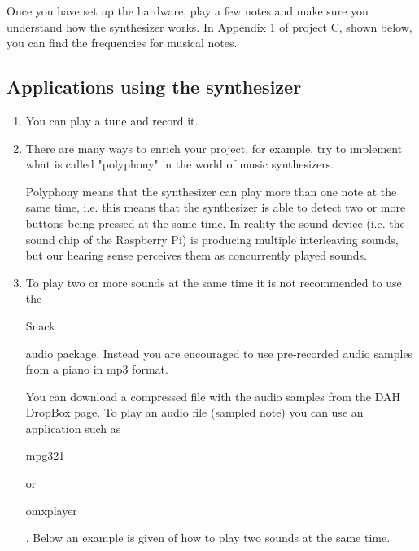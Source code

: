 Once you have set up the hardware, play a few notes and make sure you understand how the synthesizer works. In Appendix 1 of project C, shown below, you can find the frequencies for musical notes.


\subsection{Applications using the synthesizer}

\begin{enumerate}
\item	You can play a tune and record it.


\item There are many ways to enrich your project, for example, try to implement what is called "polyphony" in the world of music synthesizers.

Polyphony means that the synthesizer can play more than one note at the same time, i.e. this means that the synthesizer is able to detect two or more buttons being pressed at the same time. In reality the sound device (i.e. the sound chip of the Raspberry Pi) is producing multiple interleaving sounds, but our hearing sense perceives them as concurrently played sounds.

\item To play two or more sounds at the same time it is not recommended to use the \begin{tt}Snack\end{tt} audio package. Instead you are encouraged to use pre-recorded audio samples from a piano in mp3 format. 

You can download a compressed file with the audio samples from the DAH DropBox page. To play an audio file (sampled note) 
you can use an application such as \begin{tt}mpg321\end{tt} or  \begin{tt}omxplayer\end{tt}. Below an example is given of how to play two sounds at the same time.\\


\vspace*{-0.5cm}
\end{enumerate}

